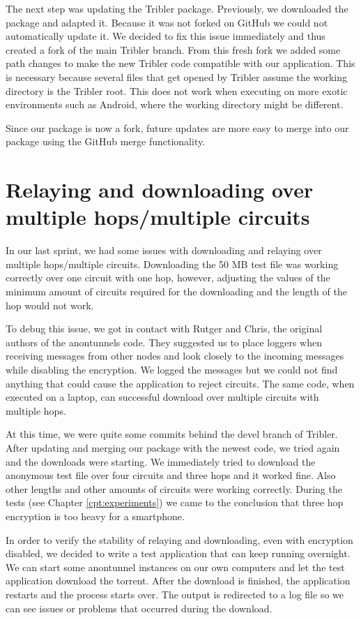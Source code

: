 		The next step was updating the Tribler package. Previously, we downloaded the package and adapted it. Because it was not forked on GitHub we could not automatically update it. We decided to fix this issue immediately and thus created a fork of the main Tribler branch. From this fresh fork we added some path changes to make the new Tribler code compatible with our application. This is necessary because several files that get opened by Tribler assume the working directory is the Tribler root. This does not work when executing on more exotic environments such as Android, where the working directory might be different.
		
		Since our package is now a fork, future updates are more easy to merge into our package using the GitHub merge functionality.
			
	\section{Relaying and downloading over multiple hops/multiple circuits}
		In our last sprint, we had some issues with downloading and relaying over multiple hops/multiple circuits. Downloading the 50 MB test file was working correctly over one circuit with one hop, however, adjusting the values of the minimum amount of circuits required for the downloading and the length of the hop would not work.
		
		To debug this issue, we got in contact with Rutger and Chris, the original authors of the anontunnels code. They suggested us to place loggers when receiving messages from other nodes and look closely to the incoming messages while disabling the encryption. We logged the messages but we could not find anything that could cause the application to reject circuits. The same code, when executed on a laptop, can successful download over multiple circuits with multiple hops.
		
		At this time, we were quite some commits behind the devel branch of Tribler. After updating and merging our package with the newest code, we tried again and the downloads were starting. We immediately tried to download the anonymous test file over four circuits and three hops and it worked fine. Also other lengths and other amounts of circuits were working correctly. During the tests (see Chapter \ref{cpt:experiments}) we came to the conclusion that three hop encryption is too heavy for a smartphone.
		
		In order to verify the stability of relaying and downloading, even with encryption disabled, we decided to write a test application that can keep running overnight. We can start some anontunnel instances on our own computers and let the test application download the torrent. After the download is finished, the application restarts and the process starts over. The output is redirected to a log file so we can see issues or problems that occurred during the download.
			

